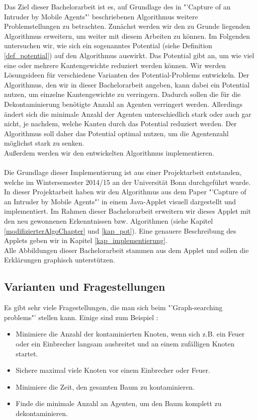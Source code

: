 Das Ziel dieser Bachelorarbeit ist es, auf Grundlage des in "'Capture of an Intruder by Mobile Agents"' \cite{cima_paper} beschriebenen Algorithmus weitere Problemstellungen zu betrachten. Zunächst werden wir den zu Grunde liegenden Algorithmus erweitern, um weiter mit diesem Arbeiten zu können. Im Folgenden untersuchen wir, wie sich ein sogenanntes Potential (siehe Definition \ref{def_potential}) auf den Algorithmus auswirkt. Das Potential gibt an, um wie viel eine oder mehrere Kantengewichte reduziert werden können. Wir werden Lösungsideen für verschiedene Varianten des Potential-Problems entwickeln. Der Algorithmus, den wir in dieser Bachelorarbeit angeben, kann dabei ein Potential nutzen, um einzelne Kantengewichte zu verringern. Dadurch sollen die für die Dekontaminierung benötigte Anzahl an Agenten verringert werden. Allerdings ändert sich die minimale Anzahl der Agenten unterschiedlich stark oder auch gar nicht, je nachdem, welche Kanten durch das Potential reduziert werden. Der Algorithmus soll daher das Potential optimal nutzen, um die Agentenzahl möglichst stark zu senken.\\
Außerdem werden wir den entwickelten Algorithmus implementieren.
\\
\\
Die Grundlage dieser Implementierung ist aus einer Projektarbeit entstanden, welche im Wintersemester 2014/15 an der Universität Bonn durchgeführt wurde.
In dieser Projektarbeit haben wir den Algorithmus aus dem Paper "'Capture of an Intruder by Mobile Agents"' \cite{cima_paper} in einem Java-Applet visuell dargestellt und implementiert. Im Rahmen dieser Bachelorarbeit erweitern wir dieses Applet mit den neu gewonnenen Erkenntnissen bzw. Algorithmen (siehe Kapitel \ref{modifizierterAlgoChapter} und \ref{kap_pot}). Eine genauere Beschreibung des Applets geben wir in Kapitel \ref{kap_implementierung}.\\
Alle Abbildungen dieser Bachelorarbeit stammen aus dem Applet und sollen die Erklärungen graphisch unterstützen.



\subsection{Varianten und Fragestellungen}


Es gibt sehr viele Fragestellungen, die man sich beim "'Graph-searching problems"' stellen kann. Einige sind zum Beispiel \cite{firefighterproblem_paper}:
\begin{itemize}
	\item Minimiere die Anzahl der kontaminierten Knoten, wenn sich z.B. ein Feuer oder ein Einbrecher langsam ausbreitet und an einem zufälligen Knoten startet.
	\item Sichere maximal viele Knoten vor einem Einbrecher oder Feuer.
	\item Minimiere die Zeit, den gesamten Baum zu kontaminieren.
	\item Finde die minimale Anzahl an  Agenten, um den Baum komplett zu dekontaminieren.
\end{itemize}

